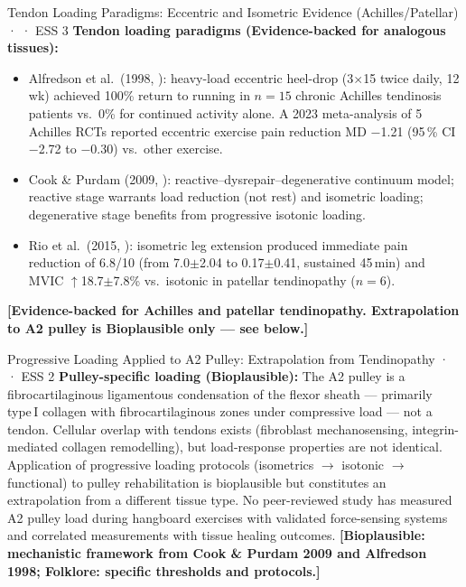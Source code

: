 \begin{evidencebox}{Tendon Loading Paradigms: Eccentric and Isometric Evidence (Achilles/Patellar) · \evidencebacked · ESS 3}
\textbf{Tendon loading paradigms (Evidence-backed for analogous tissues):}
\begin{itemize}[leftmargin=1.5em]
  \item Alfredson et al.\ (1998, \cite{APJL98}): heavy-load eccentric heel-drop (3$\times$15 twice daily, 12\,wk) achieved 100\% return to running in $n=15$ chronic Achilles tendinosis patients vs.\ 0\% for continued activity alone. A 2023 meta-analysis of 5 Achilles RCTs reported eccentric exercise pain reduction MD $-$1.21 (95\,\% CI $-$2.72 to $-$0.30) vs.\ other exercise.
  \item Cook \& Purdam (2009, \cite{CP08}): reactive--dysrepair--degenerative continuum model; reactive stage warrants load reduction (not rest) and isometric loading; degenerative stage benefits from progressive isotonic loading.
  \item Rio et al.\ (2015, \cite{RKP+15}): isometric leg extension produced immediate pain reduction of 6.8/10 (from 7.0$\pm$2.04 to 0.17$\pm$0.41, sustained 45\,min) and MVIC $\uparrow$18.7$\pm$7.8\% vs.\ isotonic in patellar tendinopathy ($n=6$).
\end{itemize}
\textbf{[Evidence-backed for Achilles and patellar tendinopathy. Extrapolation to A2 pulley is Bioplausible only --- see below.]}
\end{evidencebox}

\begin{bioplausbox}{Progressive Loading Applied to A2 Pulley: Extrapolation from Tendinopathy · \bioplausible · ESS 2}
\textbf{Pulley-specific loading (Bioplausible):} The A2 pulley is a fibrocartilaginous ligamentous condensation of the flexor sheath --- primarily type\,I collagen with fibrocartilaginous zones under compressive load --- not a tendon. Cellular overlap with tendons exists (fibroblast mechanosensing, integrin-mediated collagen remodelling), but load-response properties are not identical. Application of progressive loading protocols (isometrics $\to$ isotonic $\to$ functional) to pulley rehabilitation is bioplausible but constitutes an extrapolation from a different tissue type. No peer-reviewed study has measured A2 pulley load during hangboard exercises with validated force-sensing systems and correlated measurements with tissue healing outcomes. \textbf{[Bioplausible: mechanistic framework from Cook \& Purdam 2009 and Alfredson 1998; Folklore: specific thresholds and protocols.]}
\end{bioplausbox}

